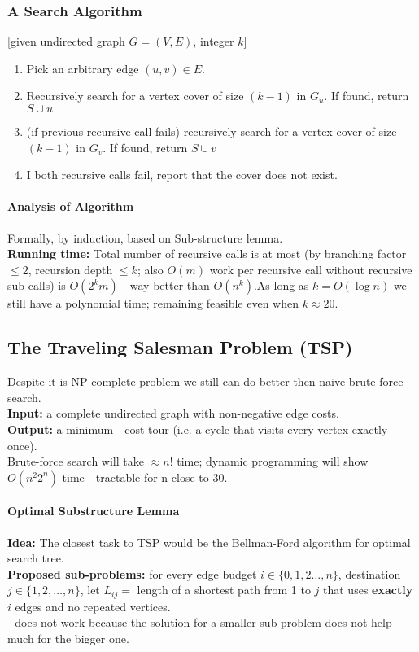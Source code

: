 \documentclass{scrartcl}
\begin{document}
\subsubsection{A Search Algorithm}
\label{sec:17-3}
[given undirected graph $G = (V, E)$, integer $k$]
\begin{enumerate}
\item Pick an arbitrary edge $(u, v) \in E$.
\item Recursively search for a vertex cover of size $(k-1)$ in $G_u$. If found,
  return $S \cup u$
\item (if previous recursive call fails) recursively search for a vertex cover
  of size $(k-1)$ in $G_v$. If found, return $S \cup v$
\item I both recursive calls fail, report that the cover does not exist. 
\end{enumerate}

\paragraph{Analysis of Algorithm}

Formally, by induction, based on Sub-structure lemma. \\
{\bf Running time: } Total number of recursive calls is at most (by branching
factor $\leq 2$, recursion depth $\leq k$; also $O(m)$ work per recursive call
without recursive sub-calls) is $O(2^k m)$ - way better than $O(n^k)$.As long as
$k = O(\log n)$ we still have a polynomial time; remaining feasible even when $k
\approx 20$.

\subsection{The Traveling Salesman Problem (TSP)}
\label{sec:17-4}
Despite it is NP-complete problem we still can do better then naive brute-force
search.\\
{\bf Input: }  a complete undirected graph with non-negative edge costs.\\
{\bf Output: } a minimum - cost tour (i.e. a cycle that visits every vertex
exactly once).\\
Brute-force search will take $\approx n!$ time; dynamic programming will show
$O(n^2 2^n)$ time - tractable for n close to 30.

\paragraph{Optimal Substructure Lemma}
{\bf Idea: } The closest task to TSP would be the Bellman-Ford algorithm for
optimal search tree.\\
{\bf Proposed sub-problems: } for every edge budget $i \in \{0, 1, 2 \dots,
n\}$, destination $j \in \{1, 2, \dots, n\}$, let $L_{ij} = $ length of a
shortest path from 1 to $j$ that uses {\bf exactly } $i$ edges and no repeated
vertices.\\
- does not work because the solution for a smaller sub-problem does not help
much for the bigger one.
\end{document}
